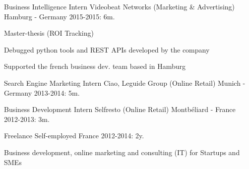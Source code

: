\begin{cventries}
  \cventry
    {Business Intelligence Intern} %
    {Videobeat Networks (Marketing \& Advertising)} %
    {Hamburg - Germany} %
    {2015-2015: 6m.} %
    {
      \begin{cvitems} %
        \item {Master-thesis (ROI Tracking)}
        \item {Debugged python tools and REST APIs developed by the company}
        \item {Supported the french business dev. team based in Hamburg}
      \end{cvitems}
    }

  \cventry
    {Search Engine Marketing Intern} %
    {Ciao, Leguide Group (Online Retail)} %
    {Munich - Germany} %
    {2013-2014: 5m.} %
    {
    }
    
	\cventry
	{Business Development Intern} %
	{Selfresto (Online Retail)} %
	{Montbéliard - France} %
	{2012-2013: 3m.} %
	{
	}
	
  \cventry
    {Freelance} %
    {Self-employed} %
    {France} %
    {2012-2014: 2y.} %
    {	
      \begin{cvitems} %
      	\item{Business development, online marketing and consulting (IT) for Startups and SMEs}
      \end{cvitems}
    }

\end{cventries}
